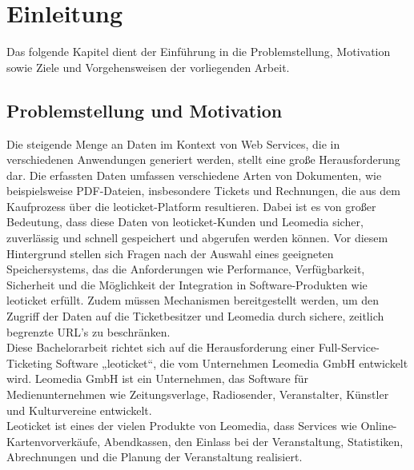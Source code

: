 \chapter{Einleitung}

Das folgende Kapitel dient der Einführung in die Problemstellung, Motivation sowie Ziele und Vorgehensweisen der vorliegenden Arbeit.

\section{Problemstellung und Motivation}

Die steigende Menge an Daten im Kontext von Web Services, die in verschiedenen Anwendungen generiert werden, stellt eine große Herausforderung dar. Die erfassten Daten umfassen verschiedene Arten von Dokumenten, wie beispielsweise PDF-Dateien, insbesondere Tickets und Rechnungen, die aus dem Kaufprozess über die leoticket-Platform resultieren. Dabei ist es von großer Bedeutung, dass diese Daten von leoticket-Kunden und Leomedia sicher, zuverlässig und schnell gespeichert und abgerufen werden können. Vor diesem Hintergrund stellen sich Fragen nach der Auswahl eines geeigneten Speichersystems, das die Anforderungen wie Performance, Verfügbarkeit, Sicherheit und die Möglichkeit der Integration in Software-Produkten wie leoticket erfüllt. Zudem müssen Mechanismen bereitgestellt werden, um den Zugriff der Daten auf die Ticketbesitzer und Leomedia durch sichere, zeitlich begrenzte URL’s zu beschränken.\\

Diese Bachelorarbeit richtet sich auf die Herausforderung einer Full-Service-Ticketing Software „leoticket“, die vom Unternehmen Leomedia GmbH entwickelt wird. 
Leomedia GmbH ist ein Unternehmen, das Software für Medienunternehmen wie Zeitungsverlage, Radiosender, Veranstalter, Künstler und Kulturvereine entwickelt. \textcite{leomedia-web}\\
Leoticket ist eines der vielen Produkte von Leomedia, dass Services wie Online-Kartenvorverkäufe, Abendkassen, den Einlass bei der Veranstaltung, Statistiken, Abrechnungen und die Planung der Veranstaltung realisiert.\textcite{leomedia-web}\\ 

